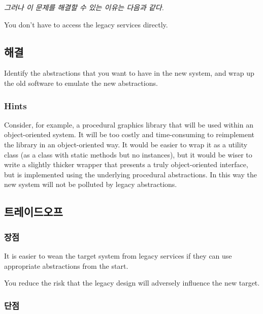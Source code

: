 \documentclass[a4paper,10pt,twoside]{book}
\begin{document}
\emph{그러나 이 문제를 해결할 수 있는 이유는 다음과 같다.}

\begin{bulletlist}
\item You don't have to access the legacy services directly.
\end{bulletlist}

\subsection*{해결}

Identify the abstractions that you want to have in the new system, and wrap up the old software to emulate the new abstractions.

\subsubsection*{Hints}

Consider, for example, a procedural graphics library that will be used within an object-oriented system. It will be too costly and time-consuming to reimplement the library in an object-oriented way. It would be easier to wrap it as a utility class (\ie as a class with static methods but no instances), but it would be wiser to write a slightly thicker wrapper that presents a truly object-oriented interface, but is implemented using the underlying procedural abstractions. In this way the new system will not be polluted by legacy abstractions. 

\subsection*{트레이드오프}

\subsubsection*{장점}

\begin{bulletlist}
\item It is easier to wean the target system from legacy services if they can use appropriate abstractions from the start.

\item You reduce the risk that the legacy design will adversely influence the new target.
\end{bulletlist}

\subsubsection*{단점}
\end{document}
